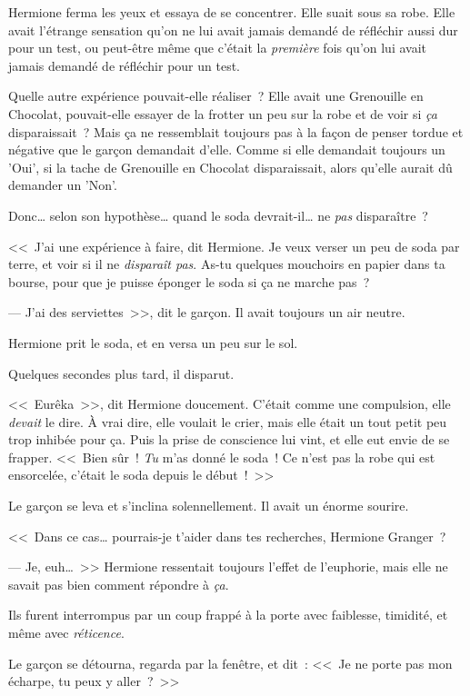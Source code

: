 Hermione ferma les yeux et essaya de se concentrer. Elle suait sous sa robe. Elle avait l'étrange sensation qu'on ne lui avait jamais demandé de réfléchir aussi dur pour un test, ou peut-être même que c'était la \emph{première} fois qu'on lui avait jamais demandé de réfléchir pour un test.

Quelle autre expérience pouvait-elle réaliser~? Elle avait une Grenouille en Chocolat, pouvait-elle essayer de la frotter un peu sur la robe et de voir si \emph{ça} disparaissait~? Mais ça ne ressemblait toujours pas à la façon de penser tordue et négative que le garçon demandait d'elle. Comme si elle demandait toujours un 'Oui', si la tache de Grenouille en Chocolat disparaissait, alors qu'elle aurait dû demander un 'Non'.

Donc… selon son hypothèse… quand le soda devrait-il… ne \emph{pas} disparaître~?

<<~J'ai une expérience à faire, dit Hermione. Je veux verser un peu de soda par terre, et voir si il ne \emph{disparaît pas}. As-tu quelques mouchoirs en papier dans ta bourse, pour que je puisse éponger le soda si ça ne marche pas~?

--- J'ai des serviettes~>>, dit le garçon. Il avait toujours un air neutre.

Hermione prit le soda, et en versa un peu sur le sol.

Quelques secondes plus tard, il disparut.

<<~Eurêka~>>, dit Hermione doucement. C'était comme une compulsion, elle \emph{devait} le dire. À vrai dire, elle voulait le crier, mais elle était un tout petit peu trop inhibée pour ça. Puis la prise de conscience lui vint, et elle eut envie de se frapper. <<~Bien sûr~! \emph{Tu} m'as donné le soda~! Ce n'est pas la robe qui est ensorcelée, c'était le soda depuis le début~!~>>

Le garçon se leva et s'inclina solennellement. Il avait un énorme sourire.

<<~Dans ce cas… pourrais-je t'aider dans tes recherches, Hermione Granger~?

--- Je, euh…~>> Hermione ressentait toujours l'effet de l'euphorie, mais elle ne savait pas bien comment répondre à \emph{ça}.

Ils furent interrompus par un coup frappé à la porte avec faiblesse, timidité, et même avec \emph{réticence}.

Le garçon se détourna, regarda par la fenêtre, et dit~: <<~Je ne porte pas mon écharpe, tu peux y aller~?~>>

